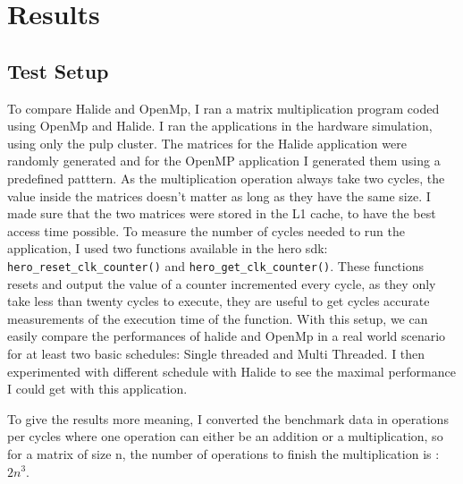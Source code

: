 
\chapter{Results}
\section{Test Setup}
	To compare Halide and OpenMp, I ran a matrix multiplication program coded using OpenMp and Halide. I ran the applications in the hardware simulation, using only the \gls{pulp} cluster. 
	The matrices for the Halide application were randomly generated and for the OpenMP application I generated them using a predefined patttern. As the multiplication operation always take two cycles, the value inside the matrices doesn't matter as long as they have the same size.
	I made sure that the two matrices were stored in the L1 cache, to have the best access time possible.
	To measure the number of cycles needed to run the application, I used two functions available in the hero sdk: \verb|hero_reset_clk_counter()| and \verb|hero_get_clk_counter()|. These functions resets and output the value of a counter incremented every cycle, as they only take less than twenty cycles to execute, they are useful to get cycles accurate measurements of the execution time of the function.
	With this setup, we can easily compare the performances of halide and OpenMp in a real world scenario for at least two basic schedules: Single threaded and Multi Threaded. I then experimented with different schedule with Halide to see the maximal performance I could get with this application.

	To give the results more meaning, I converted the benchmark data in operations per cycles where one operation can either be an addition or a multiplication, so for a matrix of size n, the number of operations to finish the multiplication is : $2n^3$.

